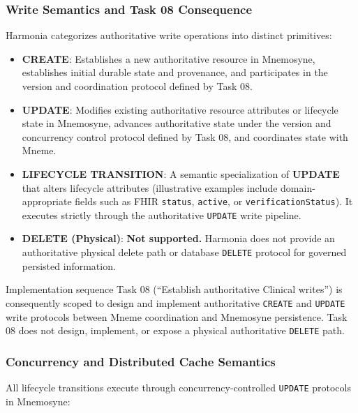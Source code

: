 \subsubsection{Write Semantics and Task 08 Consequence}

Harmonia categorizes authoritative write operations into distinct primitives:

\begin{itemize}
    \item \textbf{CREATE}: Establishes a new authoritative resource in Mnemosyne, establishes initial durable state and provenance, and participates in the version and coordination protocol defined by Task 08.
    \item \textbf{UPDATE}: Modifies existing authoritative resource attributes or lifecycle state in Mnemosyne, advances authoritative state under the version and concurrency control protocol defined by Task 08, and coordinates state with Mneme.
    \item \textbf{LIFECYCLE TRANSITION}: A semantic specialization of \textbf{UPDATE} that alters lifecycle attributes (illustrative examples include domain-appropriate fields such as FHIR \texttt{status}, \texttt{active}, or \texttt{verificationStatus}). It executes strictly through the authoritative \texttt{UPDATE} write pipeline.
    \item \textbf{DELETE (Physical)}: \textbf{Not supported.} Harmonia does not provide an authoritative physical delete path or database \texttt{DELETE} protocol for governed persisted information.
\end{itemize}

Implementation sequence Task 08 (``Establish authoritative Clinical writes'') is consequently scoped to design and implement authoritative \texttt{CREATE} and \texttt{UPDATE} write protocols between Mneme coordination and Mnemosyne persistence. Task 08 does not design, implement, or expose a physical authoritative \texttt{DELETE} path.

\subsubsection{Concurrency and Distributed Cache Semantics}

All lifecycle transitions execute through concurrency-controlled \texttt{UPDATE} protocols in Mnemosyne:

